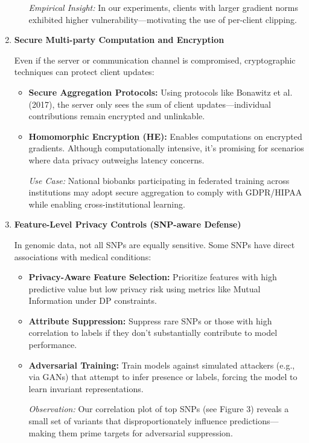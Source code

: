 \documentclass[conference]{IEEEtran}
\begin{document}
\begin{enumerate}
\begin{itemize}
        \textit{Empirical Insight:} In our experiments, clients with larger gradient norms exhibited higher vulnerability—motivating the use of per-client clipping.
    \end{itemize}

    \item \textbf{ Secure Multi-party Computation and Encryption}
    
    Even if the server or communication channel is compromised, cryptographic techniques can protect client updates:
    \begin{itemize}
        \item \textbf{Secure Aggregation Protocols:} Using protocols like Bonawitz et al. (2017), the server only sees the sum of client updates—individual contributions remain encrypted and unlinkable\cite{Bonawitz2017practical48}.
        \item \textbf{Homomorphic Encryption (HE):} Enables computations on encrypted gradients. Although computationally intensive, it’s promising for scenarios where data privacy outweighs latency concerns\cite{Smajlović2022sequre49}.
        
        \textit{Use Case:} National biobanks participating in federated training across institutions may adopt secure aggregation to comply with GDPR/HIPAA while enabling cross-institutional learning.
    \end{itemize}

    \item \textbf{Feature-Level Privacy Controls (SNP-aware Defense)}
    
    In genomic data, not all SNPs are equally sensitive. Some SNPs have direct associations with medical conditions:
    \begin{itemize}
        \item \textbf{Privacy-Aware Feature Selection:} Prioritize features with high predictive value but low privacy risk using metrics like Mutual Information under DP constraints\cite{yang2023adversarial50}.
        \item \textbf{Attribute Suppression:} Suppress rare SNPs or those with high correlation to labels if they don’t substantially contribute to model performance\cite{yang2023adversarial50}.
        \item \textbf{Adversarial Training: } Train models against simulated attackers (e.g., via GANs) that attempt to infer presence or labels, forcing the model to learn invariant representations\cite{yang2023adversarial50}.
        

        \textit{Observation:} Our correlation plot of top SNPs (see Figure 3) reveals a small set of variants that disproportionately influence predictions—making them prime targets for adversarial suppression.
    \end{itemize}
\end{enumerate}
\end{document}
